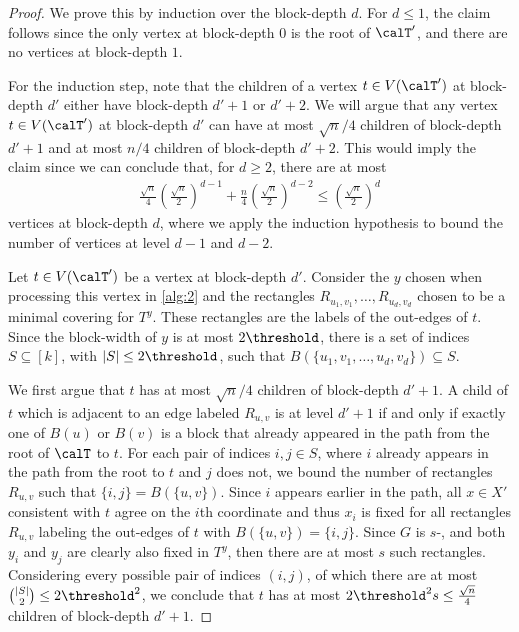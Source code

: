 {}{
\begin{proof}
    We prove this by induction over the block-depth $d$. For $d \leq 1$, the claim follows since the only vertex at block-depth $0$ is the root of $\calT '$, and there are no vertices at block-depth $1$.

    For the induction step, 
    note that the children of a vertex $t \in V(\calT')$ at block-depth $d'$ either have block-depth $d' + 1$ or $d' +2$. We will argue that any vertex $t \in V(\calT')$ at block-depth $d'$ can have at most $\sqrt{n}/4$ children of 
    block-depth $d' + 1$ and at most $n/4$ children of block-depth $d' + 2$. 
    This would imply the claim since
    we can conclude that, for $d \geq 2$, there are at most
    \begin{align*}
       \frac{\sqrt{n}}{4}\left(\frac{\sqrt{n}}{2}\right)^{d-1}
        +
       \frac{n}{4}\left(\frac{\sqrt{n}}{2}\right)^{d-2}
       \leq\left(\frac{\sqrt{n}}{2}\right)^d 
    \end{align*}
    vertices at block-depth $d$, where we apply the induction hypothesis to bound the number of vertices at level $d -1$ and $d -2$.

    Let $t \in V(\calT')$ be a vertex at block-depth $d'$. Consider the $y$ chosen when processing this vertex in \autoref{alg:2} and the rectangles $R_{u_1,v_1},\dots,R_{u_d,v_d}$ chosen to be a minimal covering for $T^y$. These rectangles are the labels of the out-edges of $t$. Since the block-width of $y$ is at most $2\threshold$, there is a set of indices $S\subseteq [k]$, with $\lvert S\rvert \leq 2\threshold$, such that $B(\{u_1,v_1,\ldots,u_{d},v_{d}\})\subseteq S$.
    
    We first argue that $t$ has at most $\sqrt{n}/4$ children of 
    block-depth $d' + 1$. 
    A child of $t$ which is adjacent to an edge labeled $R_{u,v}$ is at level $d' + 1$ if and only if exactly one of $B(u)$ or $B(v)$ is a block that already appeared in the path from the root of $\calT$ to $t$. 
    For each pair of indices $i,j \in S$, where $i$ already appears in the path from the root to $t$ and $j$ does not, we bound the number of rectangles $R_{u,v}$ such that $\{i,j\} = B(\{u,v\})$.
    Since $i$ appears earlier in the path, all $x \in X'$ consistent with $t$ agree on the $i$th coordinate and thus $x_i$ is fixed for all rectangles $R_{u,v}$ labeling the out-edges of $t$ with $ B(\{u,v\}) = \{i,j\}$. Since $G$ is $s$-\ndense, and both $y_i$ and $y_j$ are clearly also fixed in $T^y$, then there are at most 
    $s$ 
    such rectangles. 
    Considering every possible pair of indices $(i,j)$, of which there are at most $\binom{|S| }{ 2} \leq 2\threshold^2$, we conclude that $t$ has at most $2\threshold^2 s\leq \frac{\sqrt{n}}{4}$ children of 
    block-depth $d' + 1$. 
    


\end{proof}}
